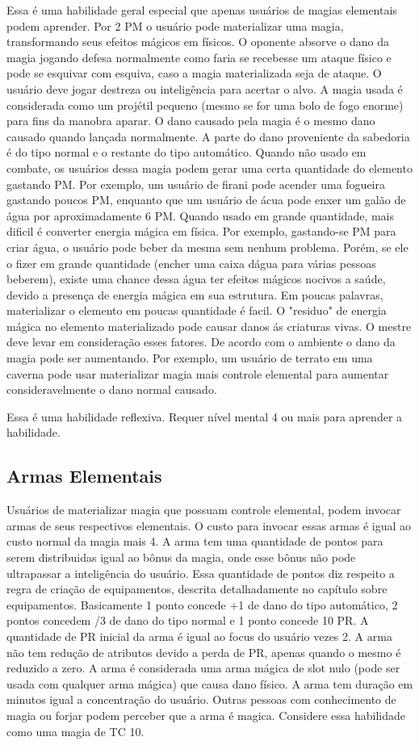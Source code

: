 Essa é uma habilidade geral especial que apenas usuários de magias elementais podem aprender. Por 2 PM o usuário pode materializar uma magia, transformando seus efeitos mágicos em físicos. O oponente absorve o dano da magia jogando defesa normalmente como faria se recebesse um ataque físico e pode se esquivar com esquiva, caso a magia materializada seja de ataque. O usuário deve jogar destreza ou inteligência para acertar o alvo. A magia usada é considerada como um projétil pequeno (mesmo se for uma bolo de fogo enorme) para fins da manobra aparar. O dano causado pela magia é o mesmo dano causado quando lançada normalmente. A parte do dano proveniente da sabedoria é do tipo normal e o restante do tipo automático. Quando não usado em combate, os usuários dessa magia podem gerar uma certa quantidade do elemento gastando PM. Por exemplo, um usuário de firani pode acender uma fogueira gastando poucos PM, enquanto que um usuário de ácua pode enxer um galão de água por aproximadamente 6 PM. Quando usado em grande quantidade, mais dificil é converter energia mágica em física. Por exemplo, gastando-se PM para criar água, o usuário pode beber da mesma sem nenhum problema. Porém, se ele o fizer em grande quantidade (encher uma caixa dágua para várias pessoas beberem), existe uma chance dessa água ter efeitos mágicos nocivos a saúde, devido a presença de energia mágica em sua estrutura. Em poucas palavras, materializar o elemento em poucas quantidade é facil. O "residuo" de energia mágica no elemento materializado pode causar danos ás criaturas vivas. O mestre deve levar em consideração esses fatores. De acordo com o ambiente o dano da magia pode ser aumentando. Por exemplo, um usuário de terrato em uma caverna pode usar materializar magia mais controle elemental para aumentar consideravelmente o dano normal causado.

Essa é uma habilidade reflexiva. Requer nível mental 4 ou mais para aprender a habilidade.  

\subsection {Armas Elementais}
 
Usuários de materializar magia que possuam controle elemental, podem invocar armas de seus respectivos elementais. O custo para invocar essas armas é igual ao custo normal da magia mais 4. A arma tem uma quantidade de pontos para serem distribuidas igual ao bônus da magia, onde esse bônus não pode ultrapassar a inteligência do usuário. Essa quantidade de pontos diz respeito a regra de criação de equipamentos, descrita detalhadamente no capítulo sobre equipamentos. Basicamente 1 ponto concede +1 de dano do tipo automático, 2 pontos concedem /3 de dano do tipo normal e 1 ponto concede 10 PR. A quantidade de PR inicial da arma é igual ao focus do usuário vezes 2. A arma não tem redução de atributos devido a perda de PR, apenas quando o mesmo é reduzido a zero. A arma é considerada uma arma mágica de slot nulo (pode ser usada com qualquer arma mágica) que causa dano físico. A arma tem duração em minutos igual a concentração do usuário. Outras pessoas com conhecimento de magia ou forjar podem perceber que a arma é magica. Considere essa habilidade como uma magia de TC 10.

